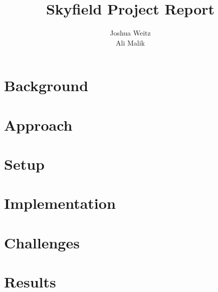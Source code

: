 \documentclass[a4paper, twoside, 12pt]{report}
\title{Skyfield Project Report}
\author{Joshua Weitz\\Ali Malik}
\begin{document}


\tableofcontents
\listoffigures
\newpage


\chapter{Background}

\chapter{Approach}

\chapter{Setup}

\chapter{Implementation}

\chapter{Challenges}

\chapter{Results}



\appendix

\label{appendix:code}



\label{appendix:profile}

\end{document}
